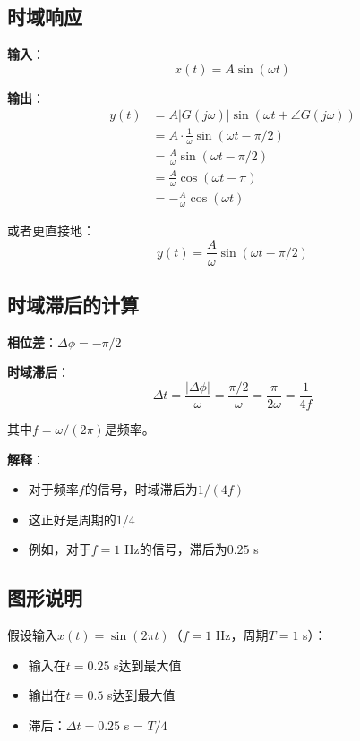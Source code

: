 \documentclass[12pt,a4paper]{article}
\begin{document}
\subsection{时域响应}

\textbf{输入}：
\begin{equation}
x(t) = A\sin(\omega t)
\end{equation}

\textbf{输出}：
\begin{align}
y(t) &= A|G(j\omega)|\sin(\omega t + \angle G(j\omega)) \\
     &= A \cdot \frac{1}{\omega} \sin(\omega t - \pi/2) \\
     &= \frac{A}{\omega} \sin(\omega t - \pi/2) \\
     &= \frac{A}{\omega} \cos(\omega t - \pi) \\
     &= -\frac{A}{\omega} \cos(\omega t)
\end{align}

或者更直接地：
\begin{equation}
y(t) = \frac{A}{\omega}\sin(\omega t - \pi/2)
\end{equation}

\subsection{时域滞后的计算}

\textbf{相位差}：$\Delta \phi = -\pi/2$

\textbf{时域滞后}：
\begin{equation}
\Delta t = \frac{|\Delta \phi|}{\omega} = \frac{\pi/2}{\omega} = \frac{\pi}{2\omega} = \frac{1}{4f}
\end{equation}

其中$f = \omega/(2\pi)$是频率。

\textbf{解释}：
\begin{itemize}
\item 对于频率$f$的信号，时域滞后为$1/(4f)$
\item 这正好是周期的$1/4$
\item 例如，对于$f = 1$ Hz的信号，滞后为$0.25$ s
\end{itemize}

\subsection{图形说明}

假设输入$x(t) = \sin(2\pi t)$（$f = 1$ Hz，周期$T = 1$ s）：

\begin{itemize}
\item 输入在$t = 0.25$ s达到最大值
\item 输出在$t = 0.5$ s达到最大值
\item 滞后：$\Delta t = 0.25$ s = $T/4$
\end{itemize}
\end{document}
